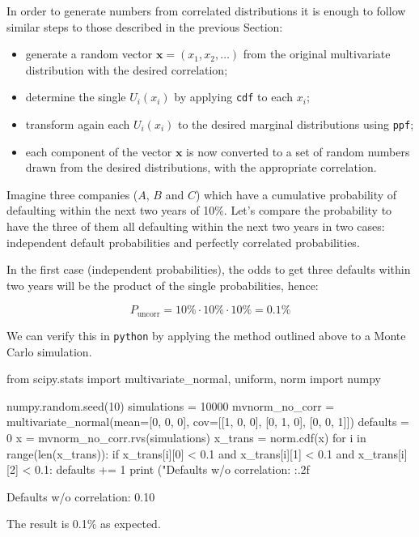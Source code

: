 In order to generate numbers from correlated distributions it is enough to follow similar steps to those described in the previous Section:

\begin{itemize}
\tightlist
\item
  generate a random vector \(\mathbf{x}=(x_1, x_2,\ldots)\) from the original multivariate distribution with the desired correlation;
\item
  determine the single \(U_i(x_i)\) by applying \texttt{cdf} to each \(x_i\);
\item
  transform again each \(U_i(x_i)\) to the desired marginal distributions using \texttt{ppf};
\item
  each component of the vector \(\mathbf{x}\) is now converted to a set of random numbers drawn from the desired distributions, with the appropriate correlation.
\end{itemize}

Imagine three companies ($A$, $B$ and $C$) which have a cumulative probability of defaulting within the next two years of 10\%.
Let's compare the probability to have the three of them all defaulting within the next two years in two cases: independent default probabilities and perfectly correlated probabilities.

In the first case (independent probabilities), the odds to get three defaults within two years will be the product of the single probabilities, hence:

\[P_{\mathrm{uncorr}} = 10\% \cdot 10\% \cdot 10\% = 0.1 \%\]

We can verify this in \texttt{python} by applying the method outlined above to a Monte Carlo simulation.%

\begin{ipython}
from scipy.stats import multivariate_normal, uniform, norm
import numpy

numpy.random.seed(10)
simulations = 10000
mvnorm_no_corr = multivariate_normal(mean=[0, 0, 0], cov=[[1, 0, 0],
                                                          [0, 1, 0],
                                                          [0, 0, 1]])
defaults = 0
x = mvnorm_no_corr.rvs(simulations)
x_trans = norm.cdf(x)
for i in range(len(x_trans)):
    if x_trans[i][0] < 0.1 and x_trans[i][1] < 0.1 and x_trans[i][2] < 0.1:
        defaults += 1
print ("Defaults w/o correlation: {:.2f}%
\end{ipython}
\begin{ioutput}
Defaults w/o correlation: 0.10%
\end{ioutput}
\noindent
The result is 0.1\% as expected.

